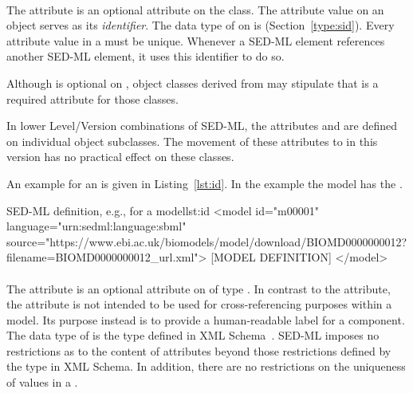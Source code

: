 \begin{blockChanged}

\paragraph*{}
\label{sec:id}
The  attribute is an optional attribute on the \SEDBase class.  The  attribute value on an object serves as its \emph{identifier}.  The data type of  on \SEDBase is  (Section~\ref{type:sid}).  Every  attribute value in a \SedDocument must be unique.  Whenever a SED-ML element references another SED-ML element, it uses this identifier to do so.

Although  is optional on \SEDBase, object classes derived from \SEDBase may stipulate that  is a required attribute for those classes.

In lower Level/Version combinations of SED-ML, the attributes  and  are defined on individual object subclasses.  The movement of these attributes to \SEDBase in this version has no practical effect on these classes.

An example for an  is given in Listing~\ref{lst:id}. In the example the model has the  .

\begin{myXmlLst}{SED-ML  definition, e.g., for a model}{lst:id}
<model id="m00001" language="urn:sedml:language:sbml"
        source="https://www.ebi.ac.uk/biomodels/model/download/BIOMD0000000012?filename=BIOMD0000000012_url.xml">
	[MODEL DEFINITION]
</model>
\end{myXmlLst}


\paragraph*{}
\label{sec:name}
The attribute  is an optional attribute on \SEDBase of type .  
In contrast to the  attribute, the  attribute
is not intended to be used for cross-referencing
purposes within a model.  Its purpose instead is to provide a
human-readable label for a component.  The data type of 
 is the type  defined in XML
Schema~\citep{biron:2000,thompson:2000}.  SED-ML imposes no restrictions
as to the content of  attributes beyond those restrictions
defined by the  type in XML Schema.
In addition, there are no restrictions on the uniqueness
of  values in a \SedDocument.


\end{blockChanged}
